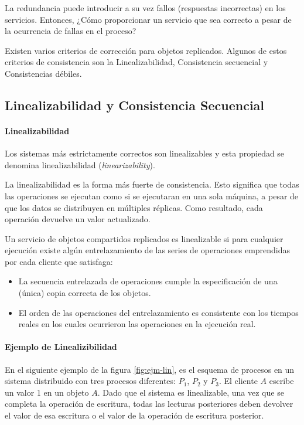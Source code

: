    La redundancia puede introducir a su vez fallos (respuestas incorrectas) en los servicios. Entonces, ¿Cómo proporcionar un servicio que sea correcto a pesar de la ocurrencia de fallas en el proceso?
   
   
   
 Existen varios criterios de corrección para objetos replicados. Algunos de estos  criterios de consistencia son la  Linealizabilidad,  Consistencia secuencial y  Consistencias débiles.
 
 \subsection{Linealizabilidad y Consistencia Secuencial}
 \paragraph{Linealizabilidad}
  Los sistemas más estrictamente correctos son linealizables y esta propiedad se denomina linealizabilidad (\textit{linearizability}). 
 
 La linealizabilidad es la forma más fuerte de \gls{consistencia}. Esto significa que todas las operaciones se ejecutan como si se ejecutaran en una sola máquina, a pesar de que los datos se distribuyen en múltiples réplicas. Como resultado, cada operación devuelve un valor actualizado.
 
 Un servicio de objetos compartidos replicados es linealizable si para cualquier ejecución existe algún entrelazamiento de las series de operaciones emprendidas por cada cliente que satisfaga:
 \begin{itemize}
 	\item  La secuencia entrelazada de operaciones cumple la especificación de una (única) copia correcta de los objetos.
 	\item El orden de las operaciones del entrelazamiento es consistente con los tiempos reales en los cuales ocurrieron las operaciones en la ejecución real.
 \end{itemize}
 
 \paragraph{Ejemplo de Linealizibilidad }
 
 
 En el siguiente ejemplo de la figura \ref{fig:ejm-lin}, es el esquema de procesos en un  sistema distribuido con tres procesos diferentes: $P_{1}$, $P_{2}$ y $P_{3}$. El cliente $A$ escribe un valor 1 en un objeto $A$. Dado que el sistema es linealizable, una vez que se completa la operación de escritura, todas las lecturas posteriores deben devolver el valor de esa escritura o el valor de la operación de escritura posterior. 
 
